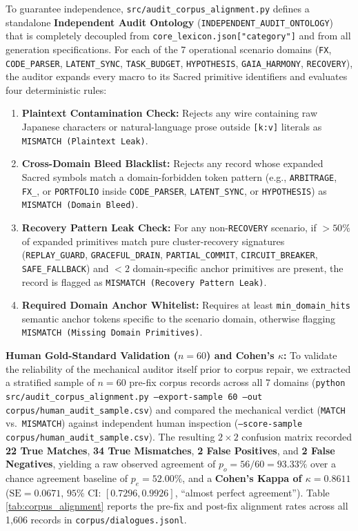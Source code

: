 \documentclass[9pt,a4paper]{extarticle}
\begin{document}
To guarantee independence, \texttt{src/audit\_\allowbreak corpus\_\allowbreak alignment.py} defines a standalone \textbf{Independent Audit Ontology} (\texttt{INDEPENDENT\_\allowbreak AUDIT\_\allowbreak ONTOLOGY}) that is completely decoupled from \texttt{core\_lexicon.json["category"]} and from all generation specifications. For each of the 7 operational scenario domains (\texttt{FX}, \texttt{CODE\_PARSER}, \texttt{LATENT\_SYNC}, \texttt{TASK\_BUDGET}, \texttt{HYPOTHESIS}, \texttt{GAIA\_HARMONY}, \texttt{RECOVERY}), the auditor expands every macro to its Sacred primitive identifiers and evaluates four deterministic rules:
\begin{enumerate}
  \item \textbf{Plaintext Contamination Check:} Rejects any wire containing raw Japanese characters or natural-language prose outside \texttt{[k:v]} literals as \texttt{MISMATCH (Plaintext Leak)}.
  \item \textbf{Cross-Domain Bleed Blacklist:} Rejects any record whose expanded Sacred symbols match a domain-forbidden token pattern (e.g., \texttt{ARBITRAGE}, \texttt{FX\_}, or \texttt{PORTFOLIO} inside \texttt{CODE\_PARSER}, \texttt{LATENT\_SYNC}, or \texttt{HYPOTHESIS}) as \texttt{MISMATCH (Domain Bleed)}.
  \item \textbf{Recovery Pattern Leak Check:} For any non-\texttt{RECOVERY} scenario, if $>50\%$ of expanded primitives match pure cluster-recovery signatures (\texttt{REPLAY\_GUARD}, \texttt{GRACEFUL\_DRAIN}, \texttt{PARTIAL\_COMMIT}, \texttt{CIRCUIT\_BREAKER}, \texttt{SAFE\_FALLBACK}) and $<2$ domain-specific anchor primitives are present, the record is flagged as \texttt{MISMATCH (Recovery Pattern Leak)}.
  \item \textbf{Required Domain Anchor Whitelist:} Requires at least \texttt{min\_domain\_hits} semantic anchor tokens specific to the scenario domain, otherwise flagging \texttt{MISMATCH (Missing Domain Primitives)}.
\end{enumerate}

\textbf{Human Gold-Standard Validation ($n=60$) and Cohen's $\kappa$:} To validate the reliability of the mechanical auditor itself prior to corpus repair, we extracted a stratified sample of $n=60$ pre-fix corpus records across all 7 domains (\texttt{python src/audit\_corpus\_alignment.py --export-sample 60 --out corpus/human\_audit\_sample.csv}) and compared the mechanical verdict (\texttt{MATCH} vs.\ \texttt{MISMATCH}) against independent human inspection (\texttt{--score-sample corpus/\allowbreak human\_audit\_sample.csv}). The resulting $2\times 2$ confusion matrix recorded \textbf{22 True Matches}, \textbf{34 True Mismatches}, \textbf{2 False Positives}, and \textbf{2 False Negatives}, yielding a raw observed agreement of $p_o = 56/60 = \mathbf{93.33\%}$ over a chance agreement baseline of $p_e = 52.00\%$, and a \textbf{Cohen's Kappa of $\kappa = 0.8611$} ($\text{SE} = 0.0671$, $95\%$ CI: $[0.7296, 0.9926]$, ``almost perfect agreement''). Table \ref{tab:corpus_alignment} reports the pre-fix and post-fix alignment rates across all 1,606 records in \texttt{corpus/dialogues.jsonl}.
\end{document}
